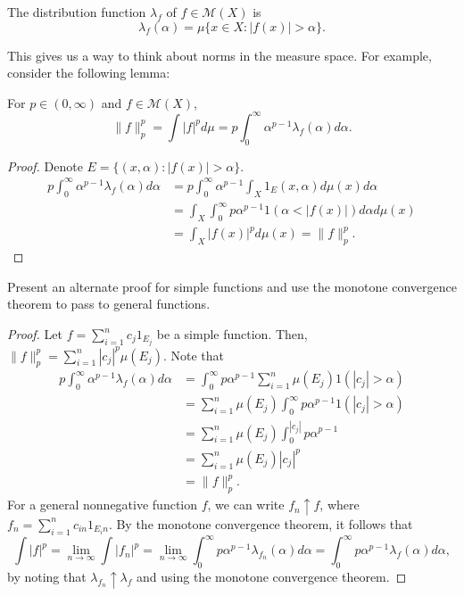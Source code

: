 \documentclass[11pt]{scrartcl}
\newcommand{\<}{\langle}
\renewcommand{\>}{\rangle}
\begin{document}
\begin{definition} The distribution function $\lambda_f$ of $f \in \mathcal M(X)$ is 
$$\lambda_f(\alpha) = \mu\{x \in X : |f(x)| > \alpha \}.$$
\end{definition}
This gives us a way to think about norms in the measure space.  For example, consider the following lemma:
\begin{lemma} For $p \in (0, \infty)$ and $f \in \mathcal M(X)$,
$$\|f\|_p^p = \int |f|^p d\mu = p\int_{0}^{\infty} \alpha^{p-1} \lambda_f(\alpha) d\alpha.$$
\end{lemma}
\begin{proof}
Denote $E = \{(x, \alpha): |f(x)| > \alpha\}$.  
\begin{align*}
p \int_{0}^{\infty} \alpha^{p-1} \lambda_f(\alpha) d\alpha &= p \int_{0}^{\infty}\alpha^{p-1} \int_X 1_E(x, \alpha)d\mu(x)d\alpha \\
&= \int_X \int_{0}^{\infty} p\alpha^{p-1} 1(\alpha < |f(x)|)d\alpha d\mu(x) \\
&= \int_X |f(x)|^p d\mu(x) = \|f\|_p^p.
\end{align*}
\end{proof}
\begin{exercise} Present an alternate proof for simple functions and use the monotone convergence theorem to pass to general functions.
\end{exercise}
\begin{proof} Let $f = \sum_{i=1}^n c_j 1_{E_j}$ be a simple function.  Then, $\|f\|_p^p = \sum_{i=1}^n |c_j|^p \mu(E_j)$.
Note that
\begin{align*}
p\int_0^\infty \alpha^{p-1}\lambda_f(\alpha)d\alpha &= \int_0^\infty p\alpha^{p-1} \sum_{i=1}^n \mu(E_j)1(|c_j| > \alpha) \\
&= \sum_{i=1}^n \mu(E_j) \int_{0}^\infty p\alpha^{p-1}1(|c_j| > \alpha) \\
&= \sum_{i=1}^n \mu(E_j) \int_{0}^|c_j| p\alpha^{p-1} \\
&= \sum_{i=1}^n \mu(E_j) |c_j|^p \\
&= \|f\|_p^p.
\end{align*}
For a general nonnegative function $f$, we can write $ f_n\uparrow f$, where $f_n = \sum_{i=1}^n c_{in}1_{E_in}$.  By the monotone convergence theorem, it follows that 
$$\int |f|^p = \lim_{n \to \infty} \int |f_n|^p = \lim_{n \to \infty} \int_{0}^\infty p\alpha^{p-1}\lambda_{f_n}(\alpha)d\alpha =  \int_{0}^\infty p\alpha^{p-1}\lambda_{f}(\alpha)d\alpha,$$
by noting that $\lambda_{f_n} \uparrow \lambda_f$ and using the monotone convergence theorem.
\end{proof}
\end{document}
